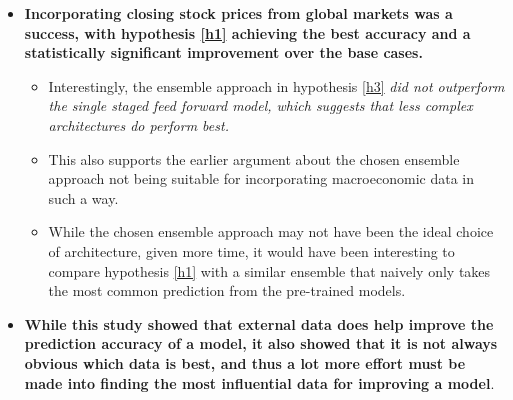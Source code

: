 \documentclass{UoYCSproject}
\begin{document}
\begin{itemize}
    \item \textbf{Incorporating closing stock prices from global markets was a success, with hypothesis \ref{h1} achieving the best accuracy and a statistically significant improvement over the base cases.}
    \begin{itemize}
        \item Interestingly, the ensemble approach in hypothesis \ref{h3}\textit{ did not outperform the single staged feed forward model, which suggests that less complex architectures do perform best.}
        \item This also supports the earlier argument about the chosen ensemble approach not being suitable for incorporating macroeconomic data in such a way. 
        \item While the chosen ensemble approach may not have been the ideal choice of architecture, given more time, it would have been interesting to compare hypothesis \ref{h1} with a similar ensemble that naively only takes the most common prediction from the pre-trained models.
    \end{itemize}
    
    \item \textbf{While this study showed that external data does help improve the prediction accuracy of a model, it also showed that it is not always obvious which data is best, and thus a lot more effort must be made into finding the most influential data for improving a model}.
\end{itemize}
\end{document}
